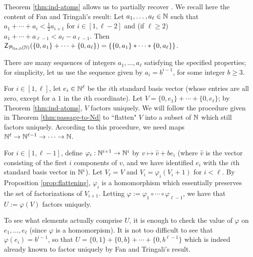 \begin{eg} \label{eg:recover-flat-unique-fac}
	Theorem \ref{thm:ind-atoms} allows us to partially recover \cite[Proposition 4.9]{fan-tringali18}.
	We recall here the content of Fan and Tringali's result: Let $a_1,\dots, a_\ell \in \mathbb{N}$ such that $a_1 + \cdots + a_i < \frac{1}{2} a_{i+1}$ for $i\in [ 1,\ell-2 ]$ and (if $\ell \ge 2$) $a_1+\cdots + a_{\ell-1} < a_\ell - a_{\ell-1}$.
	Then $\mathsf{Z}_{{\mathcal{P}_{\textrm{fin},0}(\mathbb{N})}}(\{0,a_1\}+\cdots+\{0,a_\ell\}) = \{ \{0,a_1\}*\cdots*\{0,a_\ell\}\}$.
	
	There are many sequences of integers $a_1,\dots,a_\ell$ satisfying the specified properties; for simplicity, let us use the sequence given by $a_i = b^{i-1}$, for some integer $b \ge 3$.
	
	For $i\in [ 1,\ell ]$, let $e_i \in \mathbb{N}^\ell$ be the $i$th standard basis vector (whose entries are all zero, except for a $1$ in the $i$th coordinate).
	Let $V = \{0,e_1\} + \cdots + \{0,e_\ell\}$; by Theorem \ref{thm:ind-atoms}, $V$ factors uniquely.
	We will follow the procedure given in Theorem \ref{thm:passage-to-Nd} to ``flatten" $V$ into a subset of $\mathbb{N}$ which still factors uniquely.
	According to this procedure, we need maps $\mathbb{N}^\ell \to \mathbb{N}^{\ell-1} \to \dots \to \mathbb{N}$.
	
	For $i\in [ 1,\ell-1 ]$, define $\varphi_i: \mathbb{N}^{i+1} \to \mathbb{N}^{i}$ by $v \mapsto \hat{v} + be_{i}$ (where $\hat{v}$ is the vector consisting of the first $i$ components of $v$, and we have identified $e_i$ with the $i$th standard basis vector in $\mathbb{N}^i$).
	Let $V_\ell = V$ and $V_i = \varphi_i(V_i+1)$ for $i <\ell$.
	By Proposition \ref{prop:flattening}, $\varphi_i$ is a homomorphism which essentially preserves the set of factorizations of $V_{i+1}$.
	Letting $\varphi := \varphi_1\circ \cdots \circ \varphi_{\ell-1}$, we have that $U := \varphi(V)$ factors uniquely.
	
	To see what elements actually comprise $U$, it is enough to check the value of $\varphi$ on $e_1,\dots, e_\ell$ (since $\varphi$ is a homomorpism).
	It is not too difficult to see that $\varphi(e_i) = b^{i-1}$, so that $U = \{0,1\}+\{0,b\}+\cdots+\{0,b^{\ell-1}\}$ which is indeed already known to factor uniquely by Fan and Tringali's result.
\end{eg}




